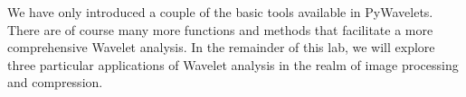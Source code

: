 We have only introduced a couple of the basic tools available in PyWavelets. There
are of course many more functions and methods that facilitate a more comprehensive
Wavelet analysis. In the remainder of this lab, we will explore three particular
applications of Wavelet analysis in the realm of image processing and compression.

